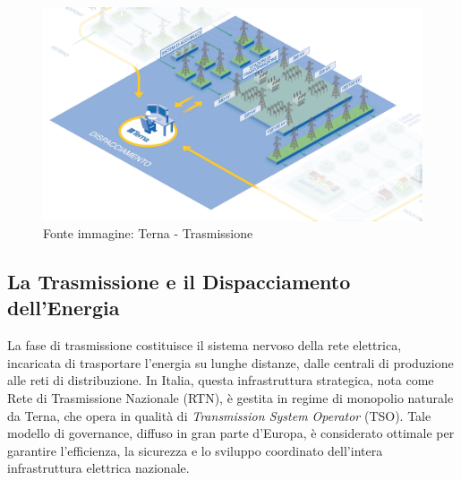 \begin{figure}[b]
    \centering
    \includegraphics[width=0.5\linewidth]{img/Terna-Trasmissione.png}
    \caption{Fonte immagine: Terna - Trasmissione}
\end{figure}

\newpage
\subsection{La Trasmissione e il Dispacciamento dell'Energia}

La fase di trasmissione costituisce il sistema nervoso della rete elettrica, incaricata di trasportare l'energia su lunghe distanze, dalle centrali di produzione alle reti di distribuzione. In Italia, questa infrastruttura strategica, nota come Rete di Trasmissione Nazionale (RTN), è gestita in regime di monopolio naturale da Terna, che opera in qualità di \textit{Transmission System Operator} (TSO). Tale modello di governance, diffuso in gran parte d'Europa, è considerato ottimale per garantire l'efficienza, la sicurezza e lo sviluppo coordinato dell'intera infrastruttura elettrica nazionale.




